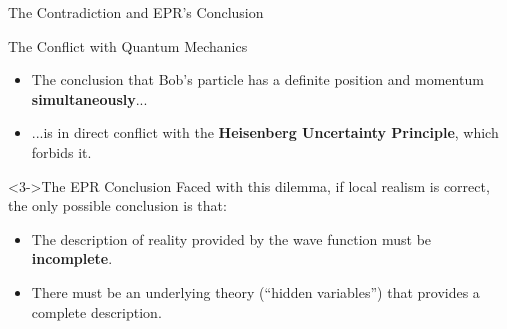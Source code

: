 \begin{frame}{The Contradiction and EPR's Conclusion}

  \begin{block}{The Conflict with Quantum Mechanics}
    \begin{itemize}[<+->]
      \item The conclusion that Bob's particle has a definite position and momentum \textbf{simultaneously}...
      \item ...is in direct conflict with the \textbf{Heisenberg Uncertainty Principle}, which forbids it.
    \end{itemize}
  \end{block}

  \begin{alertblock}<3->{The EPR Conclusion}
    Faced with this dilemma, if local realism is correct, the only possible conclusion is that:
    \begin{itemize}[<+->]
      \item The description of reality provided by the wave function must be \textbf{incomplete}.
      \item There must be an underlying theory (``hidden variables'') that provides a complete description.
    \end{itemize}
  \end{alertblock}

\end{frame}


